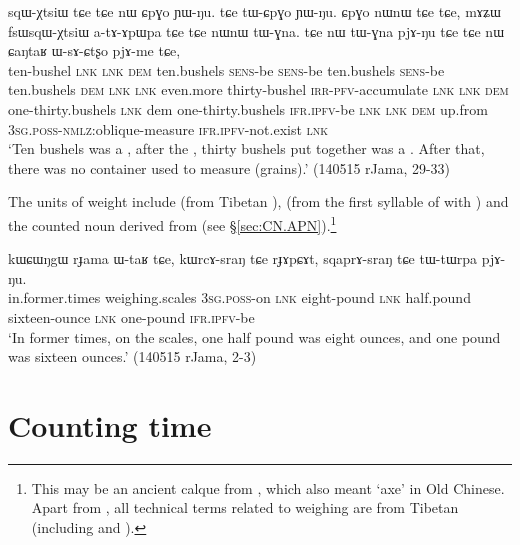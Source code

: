 \begin{exe}
\ex \label{ex:sqWXtsiW}
\gll sqɯ-χtsiɯ tɕe tɕe nɯ ɕpɣo ɲɯ-ŋu. tɕe tɯ-ɕpɣo ɲɯ-ŋu. ɕpɣo nɯnɯ tɕe tɕe, mɤʑɯ fsɯsqɯ-χtsiɯ a-tɤ-ɤpɯpa tɕe tɕe nɯnɯ tɯ-ɣna. tɕe nɯ tɯ-ɣna pjɤ-ŋu tɕe tɕe nɯ ɕaŋtaʁ ɯ-sɤ-ɕtʂo pjɤ-me tɕe, \\
ten-bushel \textsc{lnk} \textsc{lnk} \textsc{dem} ten.bushels \textsc{sens}-be \textsc{sens}-be ten.bushels \textsc{sens}-be ten.bushels  \textsc{dem} \textsc{lnk} \textsc{lnk} even.more thirty-bushel \textsc{irr}-\textsc{pfv}-accumulate \textsc{lnk} \textsc{lnk} \textsc{dem} one-thirty.bushels  \textsc{lnk} dem one-thirty.bushels \textsc{ifr}.\textsc{ipfv}-be \textsc{lnk} \textsc{lnk} \textsc{dem} up.from \textsc{3sg}.\textsc{poss}-\textsc{nmlz}:oblique-measure \textsc{ifr}.\textsc{ipfv}-not.exist \textsc{lnk} \\
\glt  `Ten bushels was a , after the , thirty bushels put together was a  . After that, there was no container used to measure (grains).'  (140515 rJama, 29-33)
\end{exe}

The units of weight include  (from Tibetan ),   (from the first syllable of  with ) and the counted noun  derived from  (see §\ref{sec:CN.APN}).\footnote{This may be an ancient calque from , which also meant `axe' in Old Chinese. Apart from , all technical terms related to weighing are from Tibetan (including  and ). } 

\begin{exe}
\ex \label{ex:sqaprAsrang}
\gll kɯɕɯŋgɯ rɟama ɯ-taʁ tɕe, kɯrcɤ-sraŋ tɕe rɟɤpɕɤt,  sqaprɤ-sraŋ tɕe tɯ-tɯrpa pjɤ-ŋu. \\
in.former.times weighing.scales \textsc{3sg}.\textsc{poss}-on \textsc{lnk} eight-pound \textsc{lnk} half.pound sixteen-ounce \textsc{lnk} one-pound \textsc{ifr}.\textsc{ipfv}-be \\
\glt  `In former times, on the scales, one half pound was eight ounces, and one pound was sixteen ounces.' (140515 rJama, 2-3)
\end{exe}
 

\section{Counting time} \label{sec:time}
